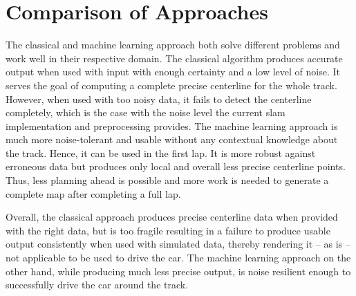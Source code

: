 \section{Comparison of Approaches}

The classical and machine learning approach both solve different problems and work well in their respective domain. The classical algorithm produces accurate output when used with input with enough certainty and a low level of noise. It serves the goal of computing a complete precise centerline for the whole track. However, when used with too noisy data, it fails to detect the centerline completely, which is the case with the noise level the current \ac{slam} implementation and preprocessing provides. The machine learning approach is much more noise-tolerant and usable without any contextual knowledge about the track. Hence, it can be used in the first lap. It is more robust against erroneous data but produces only local and overall less precise centerline points. Thus, less planning ahead is possible and more work is needed to generate a complete map after completing a full lap.

Overall, the classical approach produces precise centerline data when provided with the right data, but is too fragile resulting in a failure to produce usable output consistently when used with simulated data, thereby rendering it – as is – not applicable to be used to drive the car. The machine learning approach on the other hand, while producing much less precise output, is noise resilient enough to successfully drive the car around the track.

